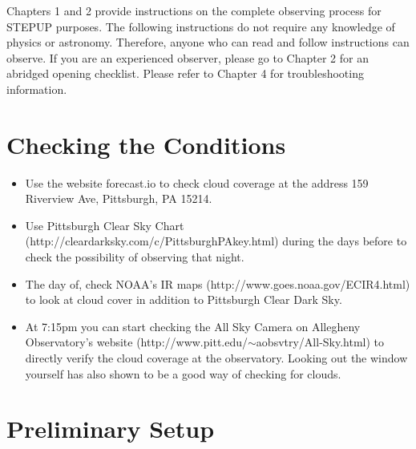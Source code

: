 \documentclass[11pt]{report}
\begin{document}
Chapters 1 and 2 provide instructions on the complete observing process for STEPUP purposes. The following instructions do not require any knowledge of physics or astronomy. Therefore, anyone who can read and follow instructions can observe. If you are an experienced observer, please go to Chapter 2 for an abridged opening checklist. Please refer to Chapter 4 for troubleshooting information.

\section{Checking the Conditions}

\begin{itemize}
\item Use the website forecast.io to check cloud coverage at the address 159 Riverview Ave, Pittsburgh, PA 15214.
\item Use Pittsburgh Clear Sky Chart (http://cleardarksky.com/c/PittsburghPAkey.html) during the days before to check the possibility of observing that night. 
\item The day of, check NOAA's IR maps (http://www.goes.noaa.gov/ECIR4.html) to look at cloud cover in addition to Pittsburgh Clear Dark Sky.
\item At 7:15pm you can start checking the All Sky Camera on Allegheny Observatory's website (http://www.pitt.edu/$\sim$aobsvtry/All-Sky.html) to directly verify the cloud coverage at the observatory. Looking out the window yourself has also shown to be a good way of checking for clouds.
\end{itemize}

\section{Preliminary Setup}
\end{document}
